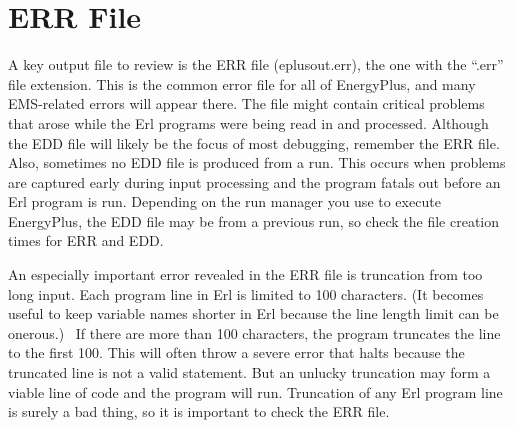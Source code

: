 \section{ERR File}\label{err-file}

A key output file to review is the ERR file (eplusout.err), the one with the ``.err'' file extension. This is the common error file for all of EnergyPlus, and many EMS-related errors will appear there. The file might contain critical problems that arose while the Erl programs were being read in and processed. Although the EDD file will likely be the focus of most debugging, remember the ERR file. Also, sometimes no EDD file is produced from a run. This occurs when problems are captured early during input processing and the program fatals out before an Erl program is run. Depending on the run manager you use to execute EnergyPlus, the EDD file may be from a previous run, so check the file creation times for ERR and EDD.

An especially important error revealed in the ERR file is truncation from too long input. Each program line in Erl is limited to 100 characters. (It becomes useful to keep variable names shorter in Erl because the line length limit can be onerous.)~ If there are more than 100 characters, the program truncates the line to the first 100. This will often throw a severe error that halts because the truncated line is not a valid statement. But an unlucky truncation may form a viable line of code and the program will run. Truncation of any Erl program line is surely a bad thing, so it is important to check the ERR file.
